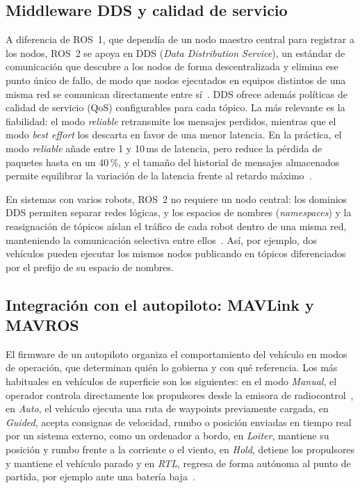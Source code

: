  
\subsection{Middleware DDS y calidad de servicio}
\label{subsec:dds_qos}
 
A diferencia de ROS~1, que dependía de un nodo maestro central para registrar a los
nodos, ROS~2 se apoya en DDS (\textit{Data Distribution Service}), un estándar de
comunicación que descubre a los nodos de forma descentralizada y elimina ese punto
único de fallo, de modo que nodos ejecutados en equipos distintos de una misma red se
comunican directamente entre sí~\cite{albatati2026}. DDS ofrece además políticas de
calidad de servicio (QoS) configurables para cada tópico. La más relevante es la
fiabilidad: el modo \textit{reliable} retransmite los mensajes perdidos, mientras que el
modo \textit{best effort} los descarta en favor de una menor latencia. En la práctica,
el modo \textit{reliable} añade entre 1 y 10\,ms de latencia, pero reduce la pérdida de
paquetes hasta en un 40\,\%, y el tamaño del historial de mensajes almacenados permite
equilibrar la variación de la latencia frente al retardo máximo~\cite{albatati2026}.
 
En sistemas con varios robots, ROS~2 no requiere un nodo central: los dominios DDS
permiten separar redes lógicas, y los espacios de nombres (\textit{namespaces}) y la
reasignación de tópicos aíslan el tráfico de cada robot dentro de una misma red,
manteniendo la comunicación selectiva entre ellos~\cite{albatati2026}. Así, por ejemplo,
dos vehículos pueden ejecutar los mismos nodos publicando en tópicos diferenciados por
el prefijo de su espacio de nombres.
 
\subsection{Integración con el autopiloto: MAVLink y MAVROS}
\label{subsec:mavlink_mavros}
 
El firmware de un autopiloto organiza el comportamiento del vehículo en modos de
operación, que determinan quién lo gobierna y con qué referencia. Los más habituales en
vehículos de superficie son los siguientes: en el modo \textit{Manual}, el operador controla directamente los propulsores
desde la emisora de radiocontrol~\cite{iniesta2025}, en \textit{Auto}, el vehículo
ejecuta una ruta de waypoints previamente cargada, en \textit{Guided}, acepta consignas
de velocidad, rumbo o posición enviadas en tiempo real por un sistema externo, como un
ordenador a bordo, en \textit{Loiter}, mantiene su posición y rumbo frente a la
corriente o el viento, en \textit{Hold}, detiene los propulsores y mantiene el vehículo parado 
y en \textit{RTL}, regresa de forma autónoma al punto de partida,
por ejemplo ante una batería baja~\cite{kumar2025}.
 

